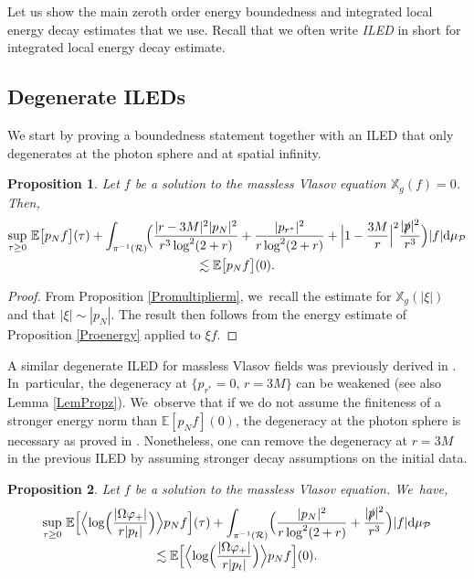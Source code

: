 \documentclass[10pt]{amsart}
\theoremstyle{plain}
\newtheorem{proposition}{Proposition}[section]
\theoremstyle{definition}
\newcommand\T{{\mathbb{X}}}
\newcommand\dr{{\mathrm{d}}}
\begin{document}
Let us show the main zeroth order energy boundedness and integrated local energy decay estimates that we use. Recall that we often write \emph{ILED} in short for integrated local energy decay estimate.

\subsection{Degenerate ILEDs}

We start by proving a boundedness statement together with an ILED that only degenerates at the photon sphere and at spatial infinity.

\begin{proposition}\label{ProremainderILED}
Let $f$ be a solution to the massless Vlasov equation $\T_g(f)=0$. Then,\vspace*{-5pt}
\begin{multline*}
\sup_{\tau \geq 0} \,\mathbb{E} \bigl[ p_N f \bigr](\tau)+\int_{\pi^{-1}(\mathcal{R})} \! \Bigl(\frac{|r-3M|^2|p_N|^2}{r^3 \log^2(2+r)}+ \frac{|p_{r^*}|^2 }{r \log^2(2+r)} + \Bigl |1-\frac{3M}{r} \Bigr|^2 \frac{|\slashed{p}|^2}{r^3} \Bigr) |f| \dr \mu_{\mathcal{P}} \\
\lesssim \mathbb{E} \bigl[ p_Nf \bigr](0).
\end{multline*}
\end{proposition}

\begin{proof}
From Proposition \ref{Promultiplierm}, we~recall the estimate for $\T_g(|\xi|)$ and that $|\xi|\sim |p_N|$. The result then follows from the energy estimate of Proposition \ref{Proenergy} applied to $\xi f$.
\end{proof}

A similar degenerate ILED for massless Vlasov fields was previously derived in \cite[Prop.\,3.4]{L23}. In~particular, the degeneracy at $\{p_{r^*}=0, \, r=3M \}$ can be weakened (see also Lemma \ref{LemPropz}). We~observe that if we do not assume the finiteness of a stronger energy norm than $\mathbb{E}[p_N f](0)$, the degeneracy at the photon sphere is necessary as proved in \cite[Prop.\,3.12]{L23}. Nonetheless, one can remove the degeneracy at $r=3M$ in the previous ILED by assuming stronger decay assumptions on the initial data.

\begin{proposition}\label{ProILED}
Let $f$ be a solution to the massless Vlasov equation. We~have,\vspace*{-5pt}
\begin{multline*}
\sup_{\tau \geq 0} \, \mathbb{E} \Bigl[ \Bigl\langle \log \Bigl(\frac{|\Omega \varphi_+ |}{r|p_t|} \Bigr) \Bigr\rangle p_N f \Bigr](\tau)+ \int_{\pi^{-1}(\mathcal{R})} \Bigl(\frac{|p_N|^2}{r \log^2(2+r)}+ \frac{|\slashed{p}|^2}{r^3} \Bigr) |f| \dr \mu_{\mathcal{P}} \\[-3pt]
\lesssim \mathbb{E} \Bigl[ \Bigl\langle \log \Bigl(\frac{|\Omega \varphi_+ |}{r|p_t|} \Bigr) \Bigr\rangle p_N f \Bigr](0).
\end{multline*}
\end{proposition}
\end{document}
